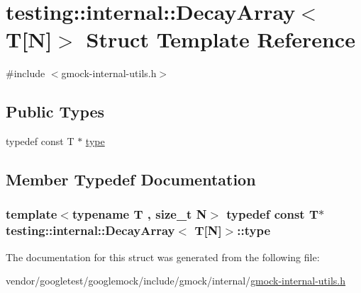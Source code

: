 \hypertarget{structtesting_1_1internal_1_1DecayArray_3_01T[N]_4}{}\section{testing\+:\+:internal\+:\+:Decay\+Array$<$ T\mbox{[}N\mbox{]}$>$ Struct Template Reference}
\label{structtesting_1_1internal_1_1DecayArray_3_01T[N]_4}


{\ttfamily \#include $<$gmock-\/internal-\/utils.\+h$>$}

\subsection*{Public Types}
\begin{DoxyCompactItemize}
\item 
typedef const T $\ast$ \hyperlink{structtesting_1_1internal_1_1DecayArray_3_01T[N]_4_afc22a88da484b94639501c07fb90bfd3}{type}
\end{DoxyCompactItemize}


\subsection{Member Typedef Documentation}
\subsubsection[{\texorpdfstring{type}{type}}]{\setlength{\rightskip}{0pt plus 5cm}template$<$typename T , size\+\_\+t N$>$ typedef const T$\ast$ {\bf testing\+::internal\+::\+Decay\+Array}$<$ T\mbox{[}N\mbox{]}$>$\+::{\bf type}}\hypertarget{structtesting_1_1internal_1_1DecayArray_3_01T[N]_4_afc22a88da484b94639501c07fb90bfd3}{}\label{structtesting_1_1internal_1_1DecayArray_3_01T[N]_4_afc22a88da484b94639501c07fb90bfd3}


The documentation for this struct was generated from the following file\+:\begin{DoxyCompactItemize}
\item 
vendor/googletest/googlemock/include/gmock/internal/\hyperlink{gmock-internal-utils_8h}{gmock-\/internal-\/utils.\+h}\end{DoxyCompactItemize}
